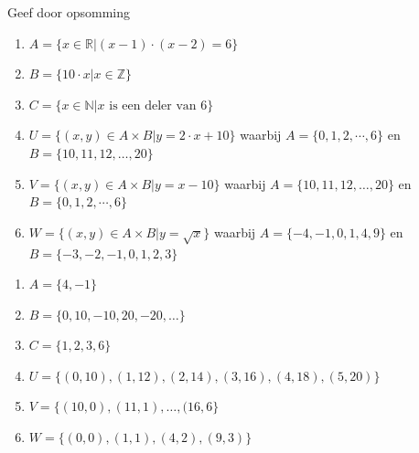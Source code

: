 \begin{oef}
Geef door opsomming
\begin{enumerate}
\item $A=\{x \in \mathbb{R} | (x-1)\cdot(x-2)=6\}$
\item $B=\{10\cdot x|x\in\mathbb{Z} \}$
\item $C=\{ x\in \mathbb{N}| x \textrm{ is een deler van } 6\}$
\item $U = \{(x, y) \in A \times B|y = 2\cdot x + 10\}$ waarbij $A = \{0,1,2,\cdots,6\}$ en \\$B = \{10,11,12,\dots,20\}$
\item $V = \{(x, y) \in A \times B|y = x - 10\}$ waarbij  $A = \{10,11,12,\dots,20\}$ en \\ $B = \{0,1,2,\cdots,6\}$
\item $W = \{(x, y) \in A \times  B|y = \sqrt{x}\}$ waarbij $A=\{-4,-1,0,1,4,9\}$ en \\ 
$B=\{-3,-2,-1,0,1,2,3\}$
\end{enumerate}
\begin{opl}
\begin{enumerate}
\item $A=\{4,-1 \}$
\item $B=\{0,10,-10,20,-20,\dots \}$
\item $C=\{1,2,3,6 \}$
\item $U=\{(0,10),(1,12),(2,14),(3,16),(4,18),(5,20) \}$
\item  $V=\{(10,0),(11,1),\dots, (16,6\}$
\item $W=\{(0,0),(1,1),(4,2),(9,3) \}$
\end{enumerate}
\end{opl}
\end{oef}




